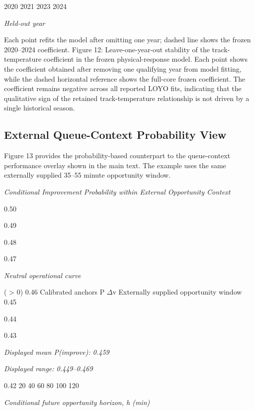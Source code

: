 2020 2021 2023 2024

\begin{center}\textit{Held-out year}\end{center}

Each point refits the model after omitting one year; dashed line shows the frozen 2020--2024 coefficient. Figure 12: Leave-one-year-out stability of the track-temperature coefficient in the frozen physical-response model. Each point shows the coefficient obtained after removing one qualifying year from model fitting, while the dashed horizontal reference shows the full-core frozen coefficient. The coefficient remains negative across all reported LOYO fits, indicating that the qualitative sign of the retained track-temperature relationship is not driven by a single historical season.

\subsection{External Queue-Context Probability View}
Figure 13 provides the probability-based counterpart to the queue-context performance overlay shown in the main text. The example uses the same externally supplied 35--55 minute opportunity window.

\begin{center}\textit{Conditional Improvement Probability within External Opportunity Context}\end{center}

0.50

0.49

0.48

0.47

\begin{center}\textit{Neutral operational curve}\end{center}

( > 0) 0.46 Calibrated anchors P \ensuremath{\Delta}v Externally supplied opportunity window 0.45

0.44

0.43

\begin{center}\textit{Displayed mean P(improve): 0.459}\end{center}

\begin{center}\textit{Displayed range: 0.449--0.469}\end{center}

0.42 20 40 60 80 100 120

\begin{center}\textit{Conditional future opportunity horizon, h (min)}\end{center}

